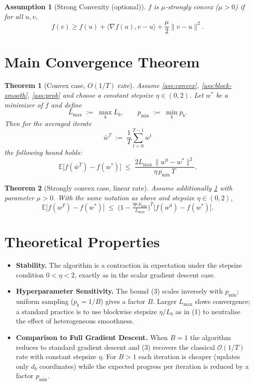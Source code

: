 \documentclass{article}
\newtheorem{theorem}{Theorem}
\newtheorem{assumption}{Assumption}
\newcommand{\E}{\mathbb{E}}
\begin{document}
\begin{assumption}[Strong Convexity (optional)]\label{ass:strong}
$f$ is $\mu$‑strongly convex ($\mu>0$) if for all $u,v$,
\[
f(v)\ge f(u)+\langle\nabla f(u),v-u\rangle+\frac{\mu}{2}\|v-u\|^{2}.
\]
\end{assumption}

\section*{Main Convergence Theorem}
\begin{theorem}[Convex case, $O(1/T)$ rate]\label{thm:convex}
Assume \ref{ass:convex}, \ref{ass:block-smooth}, \ref{ass:prob} and choose a constant stepsize
$\eta\in(0,2)$.  Let $w^{*}$ be a minimizer of $f$ and define 
\[
L_{\max}\;:=\;\max_{b}L_{b},\qquad
p_{\min}\;:=\;\min_{b}p_{b}.
\]
Then for the averaged iterate
\[
\bar w^{T}\;:=\;\frac{1}{T}\sum_{t=0}^{T-1} w^{t}
\]
the following bound holds:
\[
\E\!\bigl[f(\bar w^{T})-f(w^{*})\bigr]\;\le\;
\frac{2 L_{\max}\,\|w^{0}-w^{*}\|^{2}}{\eta\,p_{\min}\,T}.
\tag{3}
\]
\end{theorem}

\begin{theorem}[Strongly convex case, linear rate]\label{thm:strong}
Assume additionally \ref{ass:strong} with parameter $\mu>0$.
With the same notation as above and stepsize $\eta\in(0,2)$,
\[
\E\!\bigl[f(w^{T})-f(w^{*})\bigr]\;\le\;
\bigl(1-\tfrac{\eta\mu\,p_{\min}}{L_{\max}}\bigr)^{T}
\bigl[f(w^{0})-f(w^{*})\bigr].
\tag{4}
\]
\end{theorem}

\section*{Theoretical Properties}
\begin{itemize}[leftmargin=*]
\item \textbf{Stability.}  The algorithm is a contraction in expectation under the
stepsize condition $0<\eta<2$, exactly as in the scalar gradient descent case.
\item \textbf{Hyperparameter Sensitivity.}
    The bound (3) scales inversely with $p_{\min}$; uniform sampling ($p_{b}=1/B$) gives a factor $B$.
    Larger $L_{\max}$ slows convergence; a standard practice is to use blockwise stepsize
    $\eta/L_{b}$ as in (1) to neutralise the effect of heterogeneous smoothness.
\item \textbf{Comparison to Full Gradient Descent.}
    When $B=1$ the algorithm reduces to standard gradient descent and (3) recovers the classical
    $\mathcal O(1/T)$ rate with constant stepsize $\eta$.
    For $B>1$ each iteration is cheaper (updates only $d_{b}$ coordinates) while the
    expected progress per iteration is reduced by a factor $p_{\min}$.
\end{itemize}
\end{document}
